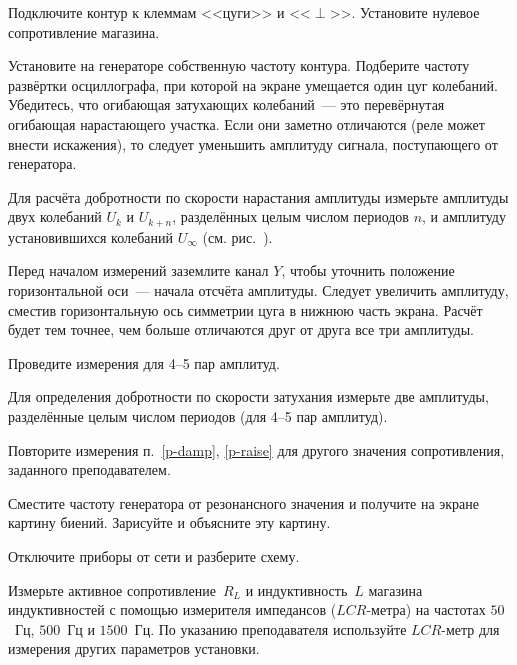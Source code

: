 \begin{lab:task}

	\item Подключите контур к клеммам <<цуги>> и <<$\perp$>>. 
    Установите нулевое сопротивление магазина.

	\item Установите на генераторе собственную частоту контура. Подберите частоту 
    развёртки осциллографа, при которой на экране умещается один цуг колебаний. 
    Убедитесь, что огибающая затухающих колебаний~--- это перевёрнутая огибающая 
    нарастающего участка. Если они заметно отличаются (реле может внести искажения), 
    то следует уменьшить амплитуду сигнала, поступающего от генератора.

	\item \label{p-damp} Для расчёта добротности по скорости нарастания амплитуды измерьте
амплитуды двух колебаний $U_k$ и $U_{k+n}$, разделённых целым числом периодов $n$,
и амплитуду установившихся колебаний $U_{\infty}$ 
(см. рис.~).

Перед началом измерений заземлите канал $Y$, чтобы уточнить положение 
горизонтальной оси~--- начала отсчёта амплитуды. 
Следует увеличить амплитуду, сместив горизонтальную ось симметрии цуга в нижнюю часть 
экрана. Расчёт будет тем точнее, чем больше отличаются друг от друга все 
три амплитуды.

Проведите измерения для 4--5 пар амплитуд.

	\item \label{p-raise} Для определения добротности по скорости затухания измерьте две
амплитуды, разделённые целым числом периодов (для 4--5 пар амплитуд).

	\item Повторите измерения п.~\ref{p-damp}, \ref{p-raise} для другого 
    значения сопротивления, заданного преподавателем.

	\item Сместите частоту генератора от резонансного значения и получите на
экране картину биений. Зарисуйте и объясните эту картину.

	\item Отключите приборы от сети и разберите схему.

	\item Измерьте активное сопротивление~$R_L$ и индуктивность~$L$ магазина
индуктивностей с помощью измерителя импедансов ($LCR$-метра) 
на частотах $50$~Гц, $500$~Гц и $1500$~Гц. По указанию преподавателя 
используйте $LCR$-метр для измерения других параметров установки.


\end{lab:task}
